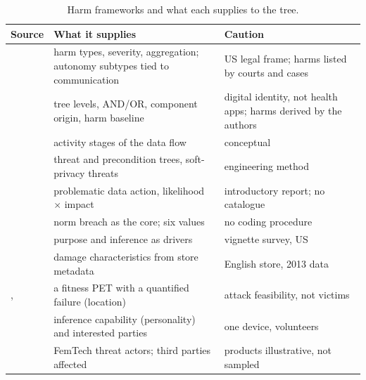 \begin{table}[t]
\centering\small
\caption{Harm frameworks and what each supplies to the tree.}
\label{tab:H-frameworks}
\begin{tabularx}{\textwidth}{@{}P{2.8cm}YY@{}}
\toprule
\textbf{Source} & \textbf{What it supplies} & \textbf{Caution}\\
\midrule
{} & harm types, severity, aggregation; autonomy subtypes tied to communication & US legal frame; harms listed by courts and cases\\
 & tree levels, AND/OR, component origin, harm baseline & digital identity, not health apps; harms derived by the authors\\
 & activity stages of the data flow & conceptual\\
 & threat and precondition trees, soft-privacy threats & engineering method\\
 & problematic data action, likelihood $\times$ impact & introductory report; no catalogue\\
 & norm breach as the core; six values & no coding procedure\\
 & purpose and inference as drivers & vignette survey, US\\
 & damage characteristics from store metadata & English store, 2013 data\\
,  & a fitness PET with a quantified failure (location) & attack feasibility, not victims\\
 & inference capability (personality) and interested parties & one device, volunteers\\
 & FemTech threat actors; third parties affected & products illustrative, not sampled\\
\bottomrule
\end{tabularx}
\end{table}

